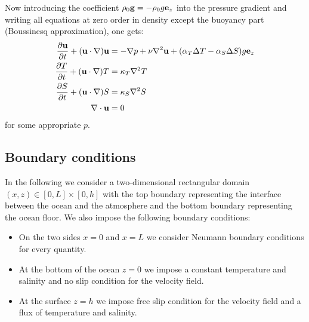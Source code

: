 \documentclass{article}
\begin{document}
Now introducing the coefficient $\rho_0\mathbf{g}=-\rho_0g\boldsymbol{\mathrm{e}}_z$ into the pressure gradient and writing all equations at zero order in density except the buoyancy part (Boussinesq approximation), one gets:
\begin{equation}\label{eq:boussinesq}
  \begin{aligned}
    \frac{\partial\mathbf{u}}{\partial t} + (\mathbf{u}\cdot\nabla)\mathbf{u} & = -\nabla p+ \nu\nabla^2\mathbf{u} + (\alpha_T\Delta T - \alpha_S\Delta S)g\boldsymbol{\mathrm{e}}_z \\
    \frac{\partial T}{\partial t} + (\mathbf{u}\cdot\nabla)T                  & = \kappa_T \nabla^2T                                                                \\
    \frac{\partial S}{\partial t} + (\mathbf{u}\cdot\nabla)S                  & = \kappa_S \nabla^2S                                                                \\
    \nabla\cdot\mathbf{u}                                                     & = 0
  \end{aligned}
\end{equation}
for some appropriate $p$.

\subsection{Boundary conditions}\label{sec:boundary_conditions}
In the following we consider a two-dimensional rectangular domain $(x,z) \in [0,L]\times[0,h]$ with the top boundary representing the interface between the ocean and the atmosphere and the bottom boundary representing the ocean floor. We also impose the following boundary conditions:
\begin{itemize}
  \item On the two sides $x = 0$ and $x = L$ we consider Neumann boundary conditions for every quantity.
  \item At the bottom of the ocean $z = 0$ we impose a constant temperature and salinity and no slip condition for the velocity field.
  \item At the surface $z = h$ we impose free slip condition for the velocity field and a flux of temperature and salinity.
\end{itemize}
\end{document}
